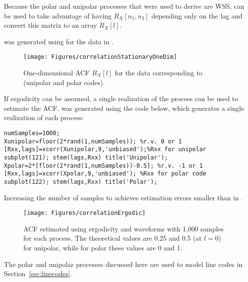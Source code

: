Because the polar and unipolar processes that were used to derive  are WSS,  can be used to take advantage of having $R_X[n_1,n_2]$ depending only on the lag and convert this matrix to an array $R_X[l]$.


 was generated using  for the data in .

\begin{figure}[htbp]
\centering
\texttt{[image: Figures/correlationStationaryOneDim]}
\caption{One-dimensional ACF $R_X[l]$ for the data corresponding to  (unipolar and polar codes).\label{fig:correlationStationaryOneDim}}
\end{figure}

If ergodicity can be assumed, a single realization of the process can be used to estimate the ACF.   was generated using the code below, which generates a single realization of each process:
\begin{lstlisting}
numSamples=1000;
Xunipolar=floor(2*rand(1,numSamples)); %r.v. 0 or 1
[Rxx,lags]=xcorr(Xunipolar,9,'unbiased');%Rxx for unipolar
subplot(121); stem(lags,Rxx) title('Unipolar');
Xpolar=2*[floor(2*rand(1,numSamples))-0.5]; %r.v. -1 or 1
[Rxx,lags]=xcorr(Xpolar,9,'unbiased'); %Rxx for polar code
subplot(122); stem(lags,Rxx) title('Polar');
\end{lstlisting}
Increasing the number of samples to  achieves estimation errors smaller than in .

\begin{figure}[htbp]
\centering
\texttt{[image: Figures/correlationErgodic]}
\caption[{ACF estimated using ergodicity and waveforms with 1,000 samples for each process.}]{ACF estimated using ergodicity and waveforms with 1,000 samples for each process. The theoretical values are 0.25 and 0.5 (at $l=0$) for unipolar, while for polar these values are 0 and 1.\label{fig:correlationErgodic}}
\end{figure}
\ifml
\else
The polar and unipolar processes discussed here are used to model line codes in Section~\ref{sec:linecodes}.
\fi
\eExample 

